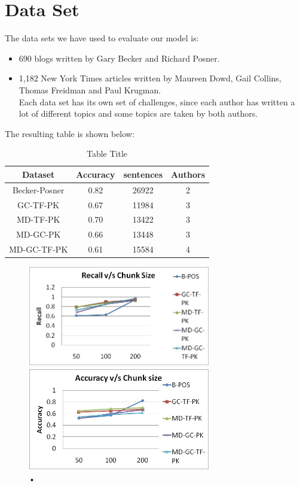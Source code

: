 \documentclass[letterpaper]{article}
\begin{document}

\section{Data Set}
The data sets we have used to evaluate our model is:
\begin{itemize}
\item 690 blogs written by Gary Becker and Richard Posner.
\item	1,182 New York Times articles written by Maureen Dowd, Gail Collins, Thomas Freidman and Paul Krugman.\\
Each data set has its own set of challenges, since each author has written a lot of different topics and some topics are taken by both authors.
\end{itemize}
The resulting table is shown below:
\begin {table}[h]
\caption {Table Title} \label{tab:title} 
\begin{center}
 \begin{tabular}{||c c c c||}
 \hline
 Dataset & Accuracy & sentences & Authors \\ [0.5ex] 
 \hline\hline
 Becker-Posner & 0.82 & 26922 & 2 \\ 
 \hline
 GC-TF-PK & 0.67 & 11984 & 3 \\
 \hline
 MD-TF-PK & 0.70 & 13422 & 3 \\
 \hline
 MD-GC-PK & 0.66 & 13448 & 3 \\
 \hline
 MD-GC-TF-PK & 0.61 & 15584 & 4 \\ [1ex] 
 \hline
\end{tabular}
\end{center}
\end{table}
\begin{figure}
\caption{•}
\includegraphics[width=8cm]{u4.jpg}
\caption{•}
\includegraphics[width=8cm]{u5.jpg}
\end{figure}
\end{document}
